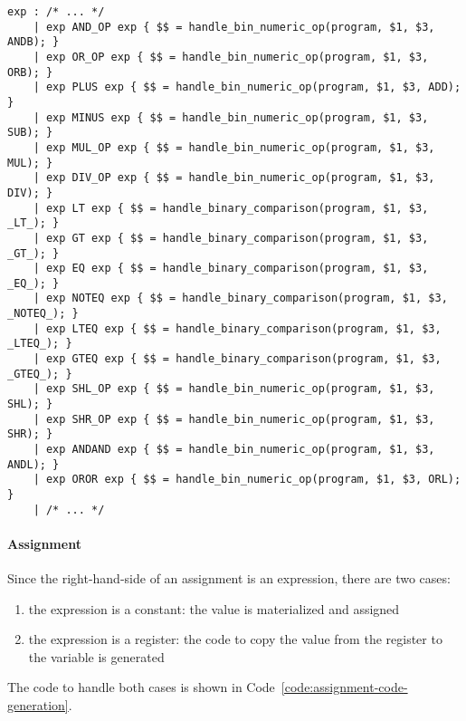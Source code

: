 \begin{onepage}
  \begin{lstlisting}[language=LANCE, caption={Constant expression operators via helper functions}, label={code:constant-expression-operators}]
exp : /* ... */
    | exp AND_OP exp { $$ = handle_bin_numeric_op(program, $1, $3, ANDB); }
    | exp OR_OP exp { $$ = handle_bin_numeric_op(program, $1, $3, ORB); }
    | exp PLUS exp { $$ = handle_bin_numeric_op(program, $1, $3, ADD); }
    | exp MINUS exp { $$ = handle_bin_numeric_op(program, $1, $3, SUB); }
    | exp MUL_OP exp { $$ = handle_bin_numeric_op(program, $1, $3, MUL); }
    | exp DIV_OP exp { $$ = handle_bin_numeric_op(program, $1, $3, DIV); }
    | exp LT exp { $$ = handle_binary_comparison(program, $1, $3, _LT_); }
    | exp GT exp { $$ = handle_binary_comparison(program, $1, $3, _GT_); }
    | exp EQ exp { $$ = handle_binary_comparison(program, $1, $3, _EQ_); }
    | exp NOTEQ exp { $$ = handle_binary_comparison(program, $1, $3, _NOTEQ_); }
    | exp LTEQ exp { $$ = handle_binary_comparison(program, $1, $3, _LTEQ_); }
    | exp GTEQ exp { $$ = handle_binary_comparison(program, $1, $3, _GTEQ_); }
    | exp SHL_OP exp { $$ = handle_bin_numeric_op(program, $1, $3, SHL); }
    | exp SHR_OP exp { $$ = handle_bin_numeric_op(program, $1, $3, SHR); }
    | exp ANDAND exp { $$ = handle_bin_numeric_op(program, $1, $3, ANDL); }
    | exp OROR exp { $$ = handle_bin_numeric_op(program, $1, $3, ORL); }
    | /* ... */
\end{lstlisting}
\end{onepage}

\paragraph{Assignment}

Since the right-hand-side of an assignment is an expression, there are two cases:

\begin{enumerate}
  \item the expression is a constant: the value is materialized and assigned
  \item the expression is a register: the code to copy the value from the register to the variable is generated
\end{enumerate}

The code to handle both cases is shown in Code~\ref{code:assignment-code-generation}.

